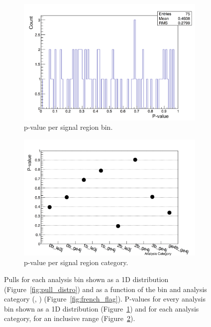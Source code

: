 \begin{figure}[h!]
  \begin{subfigure}[b]{0.46\textwidth}
    \includegraphics[width=\textwidth]{Figs/results/v0/pulls/pvalue_per_bin_img.png}
    \caption{p-value per signal region bin.}
    \label{fig:pvalue_distro}
  \end{subfigure}
  \begin{subfigure}[b]{0.46\textwidth}
    \includegraphics[width=\textwidth]{Figs/results/v0/pulls/pvalue_vs_cat_img.png}
    \caption{p-value per signal region category.}
    \label{fig:pvalue_per_cat}
  \end{subfigure}
  \caption{Pulls for each analysis bin shown as a 1D distribution
  (Figure~\ref{fig:pull_distro}) and as a function of the \HT bin and analysis
  category (\nj, \nb) (Figure~\ref{fig:french_flag}). P-values for every
  analysis bin shown as a 1D distribution (Figure~\ref{fig:pvalue_distro}) and
  for each analysis category, for an inclusive \HT range
  (Figure~\ref{fig:pvalue_per_cat}).}
  \label{fig:pull_analysis}
\end{figure}

